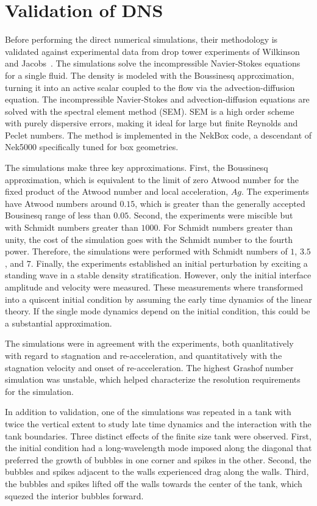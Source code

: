 \section{Validation of DNS}
Before performing the direct numerical simulations, their methodology is validated against experimental data from drop tower experiments of Wilkinson and Jacobs~\cite{Wilkinson2007}.
The simulations solve the incompressible Navier-Stokes equations for a single fluid.
The density is modeled with the Boussinesq approximation, turning it into an active scalar coupled to the flow via the advection-diffusion equation.
The incompressible Navier-Stokes and advection-diffusion equations are solved with the spectral element method (SEM).
SEM is a high order scheme with purely dispersive errors, making it ideal for large but finite Reynolds and Peclet numbers.
The method is implemented in the NekBox code, a descendant of Nek5000 specifically tuned for box geometries.

The simulations make three key approximations.
First, the Boussinesq approximation, which is equivalent to the limit of zero Atwood number for the fixed product of the Atwood number and local acceleration, $Ag$.
The experiments have Atwood numbers around $0.15$, which is greater than the generally accepted Bousinesq range of less than $0.05$.
Second, the experiments were miscible but with Schmidt numbers greater than $1000$.
For Schmidt numbers greater than unity, the cost of the simulation goes with the Schmidt number to the fourth power.
Therefore, the simulations were performed with Schmidt numbers of $1$, $3.5$, and $7$.
Finally, the experiments established an initial perturbation by exciting a standing wave in a stable density stratification.
However, only the initial interface amplitude and velocity were measured.
These measurements where transformed into a quiscent initial condition by assuming the early time dynamics of the linear theory.
If the single mode dynamics depend on the initial condition, this could be a substantial approximation.

The simulations were in agreement with the experiments, both quanlitatively with regard to stagnation and re-acceleration, and quantitatively with the stagnation velocity and onset of re-acceleration.
The highest Grashof number simulation was unstable, which helped characterize the resolution requirements for the simulation.

In addition to validation, one of the simulations was repeated in a tank with twice the vertical extent to study late time dynamics and the interaction with the tank boundaries.
Three distinct effects of the finite size tank were observed.
First, the initial condition had a long-wavelength mode imposed along the diagonal that preferred the growth of bubbles in one corner and spikes in the other.
Second, the bubbles and spikes adjacent to the walls experienced drag along the walls.
Third, the bubbles and spikes lifted off the walls towards the center of the tank, which squezed the interior bubbles forward.

